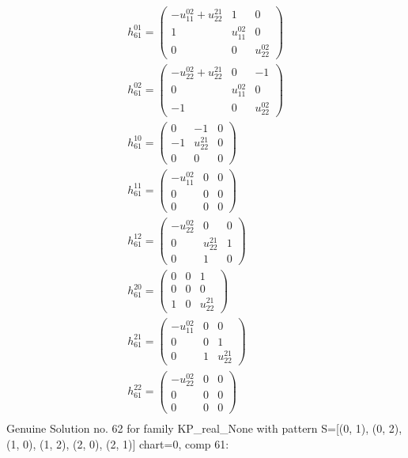 \documentclass[a4paper, 11pt, twoside, onecolumn]{article}
\begin{document}
\begin{landscape}
\begin{gather*}
	 h_{61}^{01}=\begin{pmatrix}- u^{02}_{11} + u^{21}_{22} & 1 & 0\\1 & u^{02}_{11} & 0\\0 & 0 & u^{02}_{22}\end{pmatrix}\\ 
	 h_{61}^{02}=\begin{pmatrix}- u^{02}_{22} + u^{21}_{22} & 0 & -1\\0 & u^{02}_{11} & 0\\-1 & 0 & u^{02}_{22}\end{pmatrix}\\ 
	 h_{61}^{10}=\begin{pmatrix}0 & -1 & 0\\-1 & u^{21}_{22} & 0\\0 & 0 & 0\end{pmatrix}\\ 
	 h_{61}^{11}=\begin{pmatrix}- u^{02}_{11} & 0 & 0\\0 & 0 & 0\\0 & 0 & 0\end{pmatrix}\\ 
	 h_{61}^{12}=\begin{pmatrix}- u^{02}_{22} & 0 & 0\\0 & u^{21}_{22} & 1\\0 & 1 & 0\end{pmatrix}\\ 
	 h_{61}^{20}=\begin{pmatrix}0 & 0 & 1\\0 & 0 & 0\\1 & 0 & u^{21}_{22}\end{pmatrix}\\ 
	 h_{61}^{21}=\begin{pmatrix}- u^{02}_{11} & 0 & 0\\0 & 0 & 1\\0 & 1 & u^{21}_{22}\end{pmatrix}\\ 
	 h_{61}^{22}=\begin{pmatrix}- u^{02}_{22} & 0 & 0\\0 & 0 & 0\\0 & 0 & 0\end{pmatrix}\\ 
\end{gather*} 
Genuine Solution no. 62 for family KP_real_None with pattern S=[(0, 1), (0, 2), (1, 0), (1, 2), (2, 0), (2, 1)] chart=0, comp 61: 
\begin{gather*} 

\end{gather*}
\end{landscape}
\end{document}
